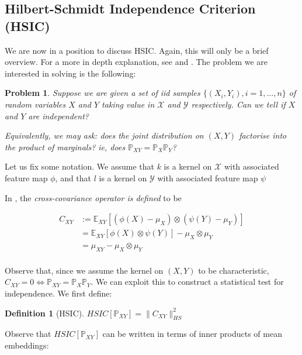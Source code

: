\documentclass[12pt]{article}
\newtheorem{definition}{Definition}
\newtheorem{problem}{Problem}
\numberwithin{claim}{section}
\numberwithin{lemma}{section}
\numberwithin{theorem}{section}
\begin{document}
\subsection{Hilbert-Schmidt Independence Criterion (HSIC)}

We are now in a position to discuss HSIC. Again, this will only be a brief overview. For a more in depth explanation, see \cite{gretton2007kernel} and \cite{gretton2005measuring}. The problem we are interested in solving is the following:

\begin{problem}
Suppose we are given a set of \emph{iid} samples  $\{(X_i,Y_i), i=1,\ldots,n\}$ of random variables $X$ and $Y$ taking value in $\mathcal{X}$ and $\mathcal{Y}$ respectively. Can we tell if $X$ and $Y$ are independent? 

Equivalently, we may ask: does the joint distribution on $(X,Y)$ factorise into the product of marginals? ie, does $\mathbb{P}_{XY} = \mathbb{P}_{X}\mathbb{P}_{Y}$?
\end{problem}

Let us fix some notation. We assume that $k$ is a kernel on $\mathcal{X}$ with associated feature map $\phi$, and that $l$ is a kernel on $\mathcal{Y}$ with associated feature map $\psi$

In \cite{gretton2005measuring}, the \emph{cross-covariance operator is defined} to be

\begin{align*}
C_{XY} &:= \mathbb{E}_{XY}[(\phi(X) - \mu_X)\otimes(\psi(Y) - \mu_Y)]\\
&= \mathbb{E}_{XY}[\phi(X)\otimes\psi(Y)] - \mu_X\otimes \mu_Y\\
& = \mu_{XY} - \mu_X\otimes \mu_Y\\
\end{align*}

Observe that, since we assume the kernel on $(X,Y)$ to be characteristic, $C_{XY} = 0 \iff \mathbb{P}_{XY} = \mathbb{P}_X\mathbb{P}_Y$. We can exploit this to construct a statistical test for independence. We first define:

\begin{definition}[HSIC]

$HSIC[\mathbb{P}_{XY}] = \|C_{XY}\|_{HS}^2$
\end{definition}

Observe that $HSIC[\mathbb{P}_{XY}]$ can be written in terms of inner products of mean embeddings:
\end{document}
